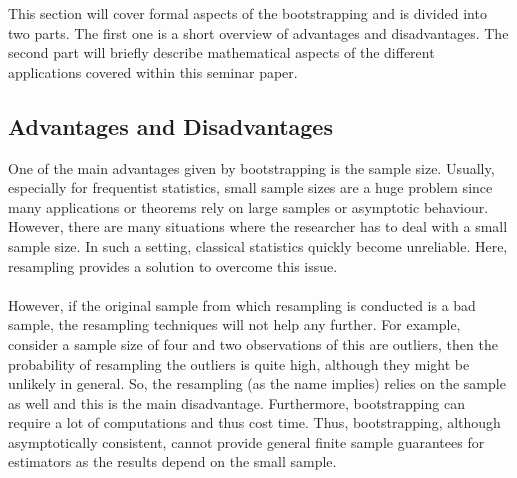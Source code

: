 This section will cover formal aspects of the bootstrapping and is divided into two parts. The first one is a short overview of advantages and disadvantages. The second part will briefly describe mathematical aspects of the different applications covered within this seminar paper. 

\subsection{Advantages and Disadvantages}
One of the main advantages given by bootstrapping is the sample size. Usually, especially for frequentist statistics, small sample sizes are a huge problem since many applications or theorems rely on large samples or asymptotic behaviour. However, there are many situations where the researcher has to deal with a small sample size. In such a setting, classical statistics quickly become unreliable. Here, resampling provides a solution to overcome this issue. \\
\\
\noindent However, if the original sample from which resampling is conducted is a bad sample, the resampling techniques will not help any further. For example, consider a sample size of four and two observations of this are outliers, then the probability of resampling the outliers is quite high, although they might be unlikely in general. So, the resampling (as the name implies) relies on the sample as well and this is the main disadvantage. Furthermore, bootstrapping can require a lot of computations and thus cost time. Thus, bootstrapping, although asymptotically consistent, cannot provide general finite sample guarantees for estimators as the results depend on the small sample. 

